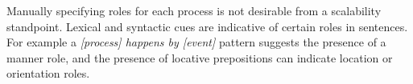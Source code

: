 Manually specifying roles for each process is not desirable from a scalability standpoint.
Lexical and syntactic cues are indicative of certain roles in sentences. 
For example a {\em [process] happens by [event]} pattern suggests the presence of a manner role, and the presence of locative prepositions can indicate location or orientation roles. 
